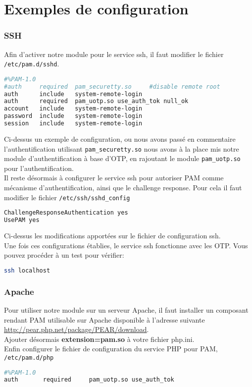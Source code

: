 \documentclass{"../../../res/univ-projet"}
\begin{document}
\newpage

\part{Exemples de configuration}
\section{SSH}
Afin d'activer notre module pour le service ssh, il faut modifier le fichier \verb?/etc/pam.d/sshd?.
\begin{lstlisting}[language=bash, backgroundcolor=\color{black}, basicstyle=\color{white}]
#%PAM-1.0
#auth     required  pam_securetty.so     #disable remote root
auth      include   system-remote-login
auth      required  pam_uotp.so use_auth_tok null_ok
account   include   system-remote-login
password  include   system-remote-login
session   include   system-remote-login
\end{lstlisting}
Ci-dessus un exemple de configuration, ou nous avons passé en commentaire l'authentification utilisant
\verb?pam_securetty.so? nous avons à la place mis notre module d'authentification à base d'OTP, en rajoutant le 
module \verb?pam_uotp.so? pour l'authentification.\\
Il reste désormais à configurer le service ssh pour autoriser PAM comme mécanisme d'authentification, 
ainsi que le challenge response. Pour cela il faut modifier le fichier \verb?/etc/ssh/sshd_config?
\begin{lstlisting}[language=bash, backgroundcolor=\color{black}, basicstyle=\color{white}]
ChallengeResponseAuthentication yes
UsePAM yes
\end{lstlisting}
Ci-dessus les modifications apportées sur le fichier de configuration ssh.\\
Une fois ces configurations établies, le service ssh fonctionne avec les OTP.
Vous pouvez procéder à un test pour vérifier:
\begin{lstlisting}[language=bash, backgroundcolor=\color{black}, basicstyle=\color{white}]
ssh localhost
\end{lstlisting}

\section{Apache}
Pour utiliser notre module sur un serveur Apache, il faut installer un composant rendant PAM utilisable
sur Apache disponible à l'adresse suivante 
\href{http://pear.php.net/package/PEAR/download}{http://pear.php.net/package/PEAR/download}.\\
Ajouter désormais \textbf{extension=pam.so} à votre fichier php.ini.\\
Enfin configurer le fichier de configuration du service PHP pour PAM, \verb?/etc/pam.d/php?
\begin{lstlisting}[language=bash, backgroundcolor=\color{black}, basicstyle=\color{white}]
#%PAM-1.0
auth       required     pam_uotp.so use_auth_tok
\end{lstlisting}
\end{document}
